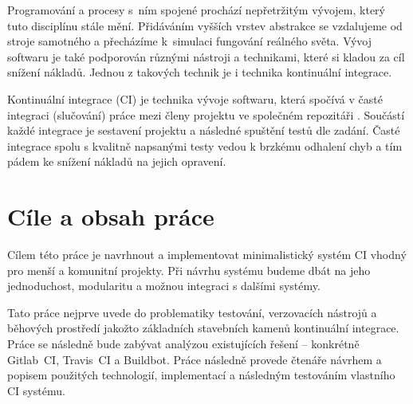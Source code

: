 \begin{introduction}

Programování a procesy s~ním spojené prochází nepřetržitým vývojem, který tuto disciplínu stále mění. 
Přidáváním vyšších vrstev abstrakce se vzdalujeme od stroje samotného a přecházíme k~simulaci fungování reálného světa.
Vývoj softwaru je také podporován různými nástroji a technikami, které si kladou za cíl snížení nákladů.
Jednou z takových technik je i technika kontinuální integrace.

Kontinuální integrace (CI) je technika vývoje softwaru, která spočívá v časté integraci (slučování) práce mezi členy projektu ve společném repozitáři \cite{fowler_ci}.
Součástí každé integrace je sestavení projektu a následné spuštění testů dle zadání.
Časté integrace spolu s kvalitně napsanými testy vedou k brzkému odhalení chyb a tím pádem ke snížení nákladů na jejich opravení.

\section{Cíle a obsah práce}

Cílem této práce je navrhnout a implementovat minimalistický systém CI vhodný pro menší a komunitní projekty.
Při návrhu systému budeme dbát na jeho jednoduchost, modularitu a možnou integraci s dalšími systémy.

Tato práce nejprve uvede do problematiky testování, verzovacích nástrojů a běhových prostředí jakožto základních stavebních kamenů kontinuální integrace.
Práce se následně bude zabývat analýzou existujících řešení -- konkrétně Gitlab~CI, Travis~CI a Buildbot.
Práce následně provede čtenáře návrhem a popisem použitých technologií, implementací a následným testováním vlastního CI systému.

\end{introduction}

